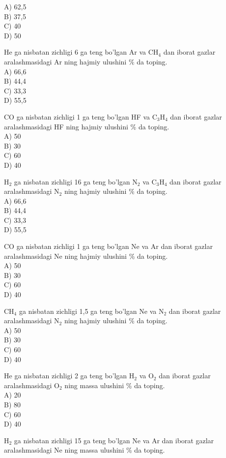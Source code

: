 A) 62,5\\
B) 37,5\\
C) 40\\
D) 50
  \item He ga nisbatan zichligi 6 ga teng bo'lgan Ar va $\mathrm{CH}_{4}$ dan iborat gazlar aralashmasidagi Ar ning hajmiy ulushini $\%$ da toping.\\
A) 66,6\\
B) 44,4\\
C) 33,3\\
D) 55,5
  \item CO ga nisbatan zichligi 1 ga teng bo'lgan HF va $\mathrm{C}_{3} \mathrm{H}_{4}$ dan iborat gazlar aralashmasidagi HF ning hajmiy ulushini \% da toping.\\
A) 50\\
B) 30\\
C) 60\\
D) 40
  \item $\mathrm{H}_{2}$ ga nisbatan zichligi 16 ga teng bo'lgan $\mathrm{N}_{2}$ va $\mathrm{C}_{3} \mathrm{H}_{4}$ dan iborat gazlar\\
aralashmasidagi $\mathrm{N}_{2}$ ning hajmiy ulushini $\%$ da toping.\\
A) 66,6\\
B) 44,4\\
C) 33,3\\
D) 55,5
  \item CO ga nisbatan zichligi 1 ga teng bo'lgan Ne va Ar dan iborat gazlar aralashmasidagi Ne ning hajmiy ulushini \% da toping.\\
A) 50\\
B) 30\\
C) 60\\
D) 40
  \item $\mathrm{CH}_{4}$ ga nisbatan zichligi 1,5 ga teng bo'lgan Ne va $\mathrm{N}_{2}$ dan iborat gazlar aralashmasidagi $\mathrm{N}_{2}$ ning hajmiy ulushini $\%$ da toping.\\
A) 50\\
B) 30\\
C) 60\\
D) 40
  \item He ga nisbatan zichligi 2 ga teng bo'lgan $\mathrm{H}_{2}$ va $\mathrm{O}_{2}$ dan iborat gazlar aralashmasidagi $\mathrm{O}_{2}$ ning massa ulushini \% da toping.\\
A) 20\\
B) 80\\
C) 60\\
D) 40
  \item $\mathrm{H}_{2}$ ga nisbatan zichligi 15 ga teng bo'lgan Ne va Ar dan iborat gazlar aralashmasidagi Ne ning massa ulushini \% da toping.\\
